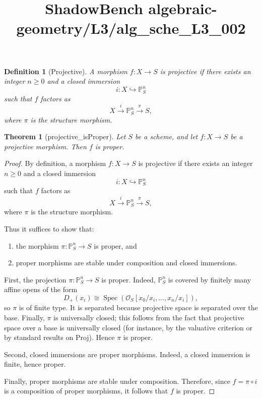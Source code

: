 \documentclass{article}
\title{ShadowBench algebraic-geometry/L3/alg\_sche\_L3\_002}
\newtheorem{theorem}{Theorem}
\newtheorem{definition}{Definition}
\begin{document}
\maketitle

\begin{definition}[Projective]
A morphism $f : X \to S$ is projective if there exists an integer $n \ge 0$ and a closed immersion
\[
i : X \hookrightarrow \mathbb{P}^n_S
\]
such that $f$ factors as
\[
X \xrightarrow{i} \mathbb{P}^n_S \xrightarrow{\pi} S,
\]
where $\pi$ is the structure morphism.
\end{definition}

\begin{theorem}[projective_isProper]
Let $S$ be a scheme, and let $f : X \to S$ be a projective morphism. Then $f$ is proper.
\end{theorem}

\begin{proof}
By definition, a morphism $f : X \to S$ is projective if there exists an integer $n \ge 0$ and a closed immersion
\[
i : X \hookrightarrow \mathbb{P}^n_S
\]
such that $f$ factors as
\[
X \xrightarrow{i} \mathbb{P}^n_S \xrightarrow{\pi} S,
\]
where $\pi$ is the structure morphism.

Thus it suffices to show that:
\begin{enumerate}
\item the morphism $\pi : \mathbb{P}^n_S \to S$ is proper, and
\item proper morphisms are stable under composition and closed immersions.
\end{enumerate}

First, the projection $\pi : \mathbb{P}^n_S \to S$ is proper. Indeed, $\mathbb{P}^n_S$ is covered by finitely many affine opens of the form
\[
D_+(x_i) \cong \operatorname{Spec}(\mathcal{O}_S[x_0/x_i,\dots,x_n/x_i]),
\]
so $\pi$ is of finite type. It is separated because projective space is separated over the base. Finally, $\pi$ is universally closed; this follows from the fact that projective space over a base is universally closed (for instance, by the valuative criterion or by standard results on Proj). Hence $\pi$ is proper.

Second, closed immersions are proper morphisms. Indeed, a closed immersion is finite, hence proper.

Finally, proper morphisms are stable under composition. Therefore, since $f = \pi \circ i$ is a composition of proper morphisms, it follows that $f$ is proper.
\end{proof}
\end{document}
